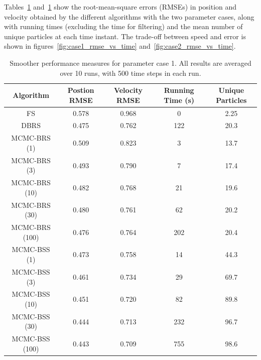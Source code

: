 \documentclass[journal]{IEEEtran}
\begin{document}
Tables~\ref{tab:case1_performance} and~\ref{tab:case1_performance} show the root-mean-square errors (RMSEs) in position and velocity obtained by the different algorithms with the two parameter cases, along with running times (excluding the time for filtering) and the mean number of unique particles at each time instant. The trade-off between speed and error is shown in figures~\ref{fig:case1_rmse_vs_time} and~\ref{fig:case2_rmse_vs_time}.

\begin{table}%
\begin{tabular}{|c||c|c|c|c|}
\hline
Algorithm & \begin{minipage}[c]{1cm} Postion RMSE \end{minipage} & \begin{minipage}[c]{1cm}  Velocity RMSE \end{minipage} & \begin{minipage}[c]{1cm}  Running Time (s) \end{minipage} & \begin{minipage}[c]{1cm}  Unique Particles \end{minipage} \\
\hline
FS 						& 0.578 & 0.968 & 0 & 2.25 \\
DBRS					& 0.475 & 0.762 & 122 & 20.3 \\
\hline
MCMC-BRS (1)	& 0.509 & 0.823 & 3 & 13.7 \\
MCMC-BRS (3)	& 0.493 & 0.790 & 7 & 17.4 \\
MCMC-BRS (10)	& 0.482 & 0.768 & 21 & 19.6 \\
MCMC-BRS (30)	& 0.480 & 0.761 & 62 & 20.2 \\
MCMC-BRS (100)& 0.476 & 0.764 & 202 & 20.4 \\
\hline
MCMC-BSS (1)	& 0.473 & 0.758 & 14 & 44.3 \\
MCMC-BSS (3)	& 0.461 & 0.734 & 29 & 69.7 \\
MCMC-BSS (10)	& 0.451 & 0.720 & 82 & 89.8 \\
MCMC-BSS (30)	& 0.444 & 0.713 & 232 & 96.7 \\
MCMC-BSS (100)& 0.443 & 0.709 & 755 & 98.6 \\
\hline
\end{tabular}
\caption{Smoother performance measures for parameter case 1. All results are averaged over 10 runs, with 500 time steps in each run.}
\label{tab:case1_performance}
\end{table}
\end{document}
